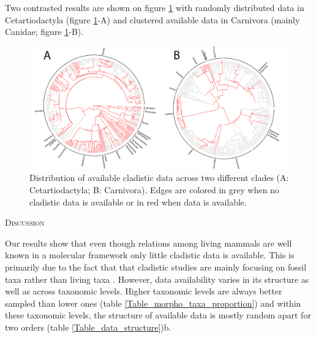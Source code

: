 \documentclass[12pt,letterpaper]{article}
\renewcommand{\section}[1]{%
\bigskip
\begin{center}
\begin{Large}
\normalfont\scshape #1
\medskip
\end{Large}
\end{center}}
\renewcommand{\subsection}[1]{%
\bigskip
\begin{center}
\begin{large}
\normalfont\itshape #1
\end{large}
\end{center}}
\begin{document}
Two contrasted results are shown on figure \ref{Figure_example_coverage} with randomly distributed data in Cetartiodactyla (figure \ref{Figure_example_coverage}-A) and clustered available data in Carnivora (mainly Canidae; figure \ref{Figure_example_coverage}-B).

\begin{figure}[!htbp]
\centering
    \includegraphics[width=1\textwidth]{example_coverage.pdf}
\caption{Distribution of available cladistic data across two different clades (A: Cetartiodactyla; B: Carnivora).
Edges are colored in grey when no cladistic data is available or in red when data is available.}
\label{Figure_example_coverage}
\end{figure}




%
%

\section{Discussion}
Our results show that even though relations among living mammals are well known in a molecular framework \citep[e.g.][]{FritzTree,meredithimpacts2011,May-Collado-PeerJ} only little cladistic data is available.
This is primarily due to the fact that that cladistic studies are mainly focusing on fossil taxa rather than living taxa \citep[e.g.][]{O'Leary08022013,ni2013oldest}.
However, data availability varies in its structure as well as across taxonomic levels.
Higher taxonomic levels are always better sampled than lower ones (table \ref{Table_morpho_taxa_proportion}) and within these taxonomic levels, the structure of available data is mostly random apart for two orders (table \ref{Table_data_structure})b.
\end{document}
